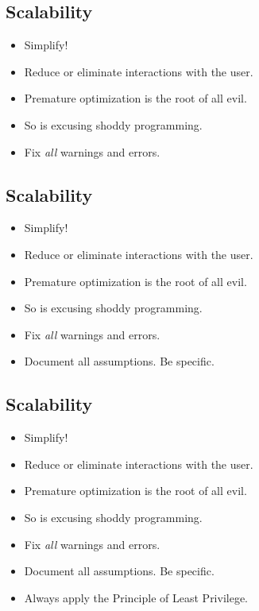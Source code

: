 \documentclass[xga]{xdvislides}
\begin{document}
\subsection{Scalability}
\begin{itemize}
	\item Simplify!
	\item Reduce or eliminate interactions with the user.
	\item Premature optimization is the root of all evil.
	\item So is excusing shoddy programming.
	\item Fix {\em all} warnings and errors.
\end{itemize}

\subsection{Scalability}
\begin{itemize}
	\item Simplify!
	\item Reduce or eliminate interactions with the user.
	\item Premature optimization is the root of all evil.
	\item So is excusing shoddy programming.
	\item Fix {\em all} warnings and errors.
	\item Document all assumptions.  Be specific.
\end{itemize}

\subsection{Scalability}
\begin{itemize}
	\item Simplify!
	\item Reduce or eliminate interactions with the user.
	\item Premature optimization is the root of all evil.
	\item So is excusing shoddy programming.
	\item Fix {\em all} warnings and errors.
	\item Document all assumptions.  Be specific.
	\item Always apply the Principle of Least Privilege.
\end{itemize}
\end{document}
